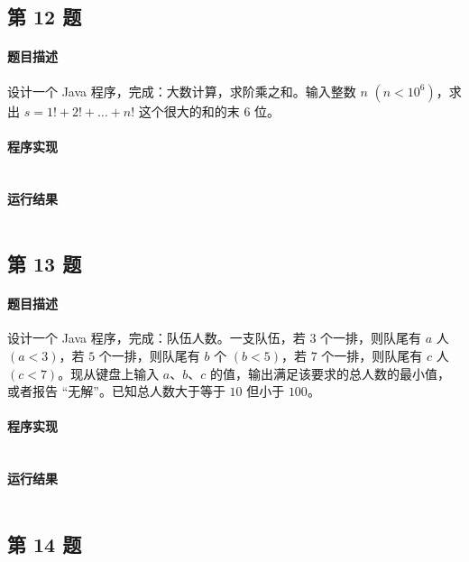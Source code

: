 \documentclass{academics}
\begin{document}
\subsection{第 12 题}

\paragraph{题目描述} {
    设计一个 Java 程序，完成：大数计算，求阶乘之和。输入整数 $n$ $\left(n<10^6\right)$，求出 $s=1!+2!+\dots+n!$ 这个很大的和的末 $6$ 位。
}

\paragraph{程序实现} {
    \inputminted[label=Solution.java]{java}{../src/P12/Solution.java}
}

\paragraph{运行结果} {
    \inputminted{text}{../res/P12.out}
}

\subsection{第 13 题}

\paragraph{题目描述} {
    设计一个 Java 程序，完成：队伍人数。一支队伍，若 $3$ 个一排，则队尾有 $a$ 人 $\left(a<3\right)$，若 $5$ 个一排，则队尾有 $b$ 个 $\left(b<5\right)$，若 $7$ 个一排，则队尾有 $c$ 人 $\left(c<7\right)$。现从键盘上输入 $a$、$b$、$c$ 的值，输出满足该要求的总人数的最小值，或者报告 ``无解''。已知总人数大于等于 $10$ 但小于 $100$。
}

\paragraph{程序实现} {
    \inputminted[label=Solution.java]{java}{../src/P13/Solution.java}
}

\paragraph{运行结果} {
    \inputminted{text}{../res/P13.out}
}

\subsection{第 14 题}
\end{document}
